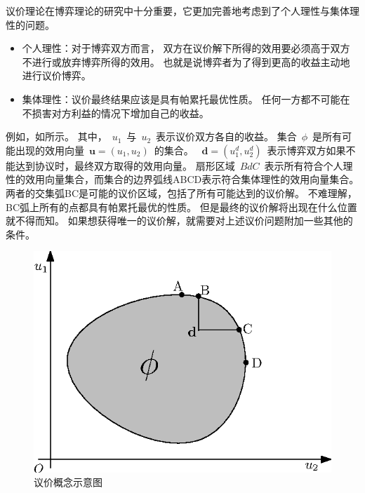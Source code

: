 议价理论在博弈理论的研究中十分重要，它更加完善地考虑到了个人理性与集体理性的问题。
\begin{itemize}
\item 个人理性：对于博弈双方而言，
双方在议价解下所得的效用要必须高于双方不进行或放弃博弈所得的效用。
也就是说博弈者为了得到更高的收益主动地进行议价博弈。
\item 集体理性：议价最终结果应该是具有帕累托最优性质。
任何一方都不可能在不损害对方利益的情况下增加自己的收益。
\end{itemize}
例如，如所示。
其中，~$u_1$~与~$u_2$~表示议价双方各自的收益。
集合~$\phi$~是所有可能出现的效用向量~$\mathbf{u}=(u_1,u_2)$~的集合。
~$\mathbf{d}=(u_1^d, u_2^d)$~表示博弈双方如果不能达到协议时，最终双方取得的效用向量。
扇形区域~$BdC$~表示所有符合个人理性的效用向量集合，而集合的边界弧线ABCD表示符合集体理性的效用向量集合。
两者的交集弧BC是可能的议价区域，包括了所有可能达到的议价解。
不难理解，BC弧上所有的点都具有帕累托最优的性质。
但是最终的议价解将出现在什么位置就不得而知。
如果想获得唯一的议价解，就需要对上述议价问题附加一些其他的条件。
\begin{figure}[!tb] 
    \centering
   \begin{minipage}[t]{0.5\linewidth} 
    \centering 
    \includegraphics[width = \textwidth]{bargain_basic_concept} 
    \caption{议价概念示意图} 
    \label{fig:chap_bargain:bargain_basic_concept} 
  \end{minipage}%
\end{figure}


